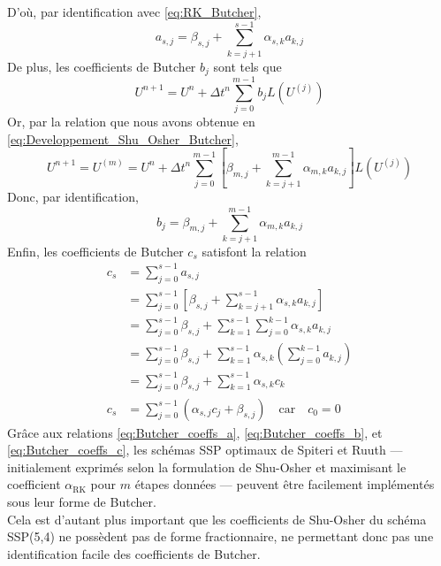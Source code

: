 \documentclass[11pt, a4paper, oneside]{report}
\begin{document}
\newpage
\noindent
D'où, par identification avec \eqref{eq:RK_Butcher},
\begin{equation} \label{eq:Butcher_coeffs_a}
    a_{s, j} = \beta_{s, j} + \sum_{k = j+1}^{s-1} \alpha_{s, k} a_{k, j}
\end{equation}
De plus, les coefficients de Butcher $b_j$ sont tels que
\begin{equation}
    U^{n+1} = U^n + \Delta t^n \sum_{j = 0}^{m-1} b_j L \left( U^{(j)} \right)
\end{equation}
Or, par la relation que nous avons obtenue en \eqref{eq:Developpement_Shu_Osher_Butcher},
\begin{equation}
    U^{n+1} = U^{(m)} = U^n + \Delta t^n \sum_{j = 0}^{m - 1} \left[ \beta_{m, j} + \sum_{k = j+1}^{m-1} \alpha_{m, k} a_{k, j} \right] L \left( U^{(j)} \right)
\end{equation}
Donc, par identification,
\begin{equation} \label{eq:Butcher_coeffs_b}
    b_j = \beta_{m, j} + \sum_{k = j+1}^{m-1} \alpha_{m, k} a_{k, j}
\end{equation}
Enfin, les coefficients de Butcher $c_s$ satisfont la relation
\begin{equation} \label{eq:Butcher_coeffs_c}
    \begin{aligned}
        c_s & = \sum_{j = 0}^{s-1} a_{s, j} \\
        & = \sum_{j = 0}^{s-1} \left[ \beta_{s, j} + \sum_{k = j+1}^{s-1} \alpha_{s, k} a_{k, j} \right] \\
        & = \sum_{j = 0}^{s-1} \beta_{s, j} + \sum_{k = 1}^{s-1} \sum_{j = 0}^{k-1} \alpha_{s, k} a_{k, j} \\
        & = \sum_{j = 0}^{s-1} \beta_{s, j} + \sum_{k = 1}^{s-1} \alpha_{s, k} \left( \sum_{j = 0}^{k-1} a_{k, j} \right) \\
        & = \sum_{j = 0}^{s-1} \beta_{s, j} + \sum_{k = 1}^{s-1} \alpha_{s, k} c_k \\
        c_s & = \sum_{j = 0}^{s-1} \left( \alpha_{s, j} c_j + \beta_{s, j} \right) \quad \text{car} \quad c_0 = 0
    \end{aligned}
\end{equation}
Grâce aux relations \eqref{eq:Butcher_coeffs_a}, \eqref{eq:Butcher_coeffs_b}, et \eqref{eq:Butcher_coeffs_c}, les schémas SSP optimaux de Spiteri et Ruuth — initialement exprimés selon la formulation de Shu-Osher et maximisant le coefficient $\alpha_\text{RK}$ pour $m$ étapes données — peuvent être facilement implémentés sous leur forme de Butcher. \\
Cela est d'autant plus important que les coefficients de Shu-Osher du schéma SSP(5,4) ne possèdent pas de forme fractionnaire, ne permettant donc pas une identification facile des coefficients de Butcher.
\end{document}

